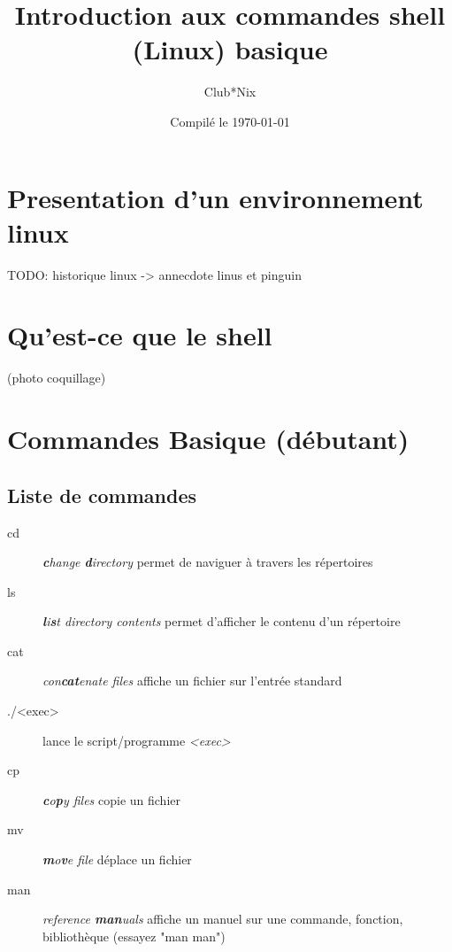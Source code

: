 \documentclass[french, a4paper, 12pt, titlepage]{article}
\begin{document}
\title{Introduction aux commandes shell (Linux) basique}
\author{Club*Nix}
\date{Compilé le \today}

\maketitle

\vfill
\pagebreak

\newpage
\strut\thispagestyle{empty}
\vfill
\pagebreak
\tableofcontents
\strut\thispagestyle{empty}
\newpage
\setcounter{page}{1}

\section{Presentation d'un environnement linux}
TODO: historique linux
-> annecdote linus et pinguin

\section{Qu'est-ce que le shell}
(photo coquillage)

\section{Commandes Basique (débutant)}
\subsection{Liste de commandes}
\begin{description}
\item[cd] \emph{\textbf{c}hange \textbf{d}irectory} permet de naviguer à travers les répertoires
\item[ls] \emph{\textbf{l}i\textbf{s}t directory contents} permet d'afficher le contenu d'un répertoire
\item[cat] \emph{con\textbf{cat}enate files} affiche un fichier sur l'entrée standard
\item[./<exec>] lance le script/programme \emph{<exec>}
\item[cp] \emph{\textbf{c}o\textbf{p}y files} copie un fichier
\item[mv] \emph{\textbf{m}o\textbf{v}e file} déplace un fichier
\item[man] \emph{reference \textbf{man}uals} affiche un manuel sur une commande, fonction, bibliothèque (essayez "man man")
\end{description}
\end{document}
